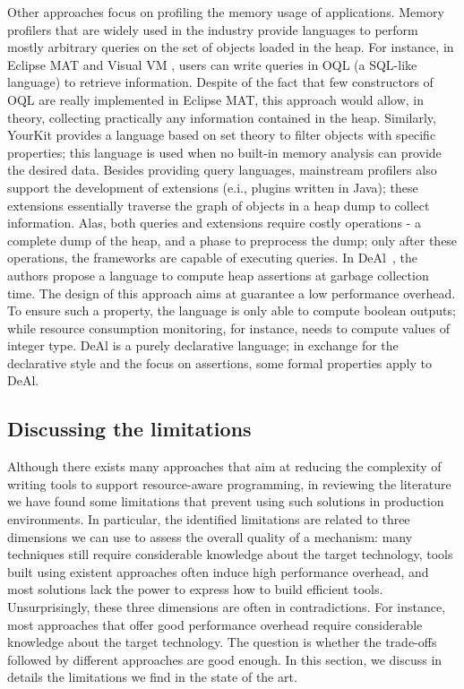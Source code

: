 Other approaches focus on profiling the memory usage of applications.
Memory profilers that are widely used in the industry provide languages to perform mostly arbitrary queries on the set of objects loaded in the heap.
For instance, in Eclipse MAT \cite{Biermann:2006:GDI:2087202.2087244} and Visual VM \cite{OQL-visualvm}, users can write queries in OQL (a SQL-like language) to retrieve information.
Despite of the fact that few constructors of OQL are really implemented in Eclipse MAT, this approach would allow, in theory, collecting practically any information contained in the heap.
Similarly, YourKit \cite{yourkit} provides a language based on set theory to filter objects with specific properties; this language is used when no built-in memory analysis can provide the desired data.
Besides providing query languages, mainstream profilers also support the development of extensions (e.i., plugins written in Java); these extensions essentially traverse the graph of objects in a heap dump to collect information.
Alas, both queries and extensions require costly operations - a complete dump of the heap, and a phase to preprocess the dump; only after these operations, the frameworks are capable of executing queries.
In DeAl~\cite{Reichenbach:2010:GCE:1869459.1869482}, the authors propose a language to compute heap assertions at garbage collection time.
The design of this approach aims at guarantee a low performance overhead.
To ensure such a property, the language is only able to compute boolean outputs; while resource consumption monitoring, for instance, needs to compute values of integer type.
DeAl is a purely declarative language; in exchange for the declarative style and the focus on assertions, some formal properties apply to DeAl. 

\subsection{Discussing the limitations}

Although there exists many approaches that aim at reducing the complexity of writing tools to support resource-aware programming, in reviewing the literature we have found some limitations that prevent using such solutions in production environments.
In particular, the identified limitations are related to three dimensions we can use to assess the overall quality of a mechanism: many techniques still require considerable knowledge about the target technology, tools built using existent approaches often induce high performance overhead, and most solutions lack the power to express how to build efficient tools.
Unsurprisingly, these three dimensions are often in contradictions.
For instance, most approaches that offer good performance overhead require considerable knowledge about the target technology.
The question is whether the trade-offs followed by different approaches are good enough.
In this section, we discuss in details the limitations we find in the state of the art.

